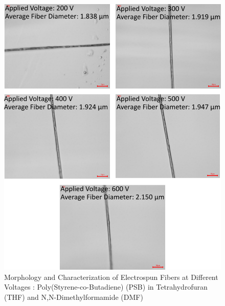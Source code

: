\begin{figure}[!th]
\centering
\includegraphics[scale=0.55]{./Figures/microscopy_psb_thf_dmf.png}
\decoRule
\caption[Morphology and Characterization of Electrospun Fibers at Different Voltages : Poly(Styrene-co-Butadiene) (PSB) in Tetrahydrofuran (THF) and N,N-Dimethylformamide (DMF) ]{Morphology and Characterization of Electrospun Fibers at Different Voltages : Poly(Styrene-co-Butadiene) (PSB) in Tetrahydrofuran (THF) and N,N-Dimethylformamide (DMF) }
\label{fig:microscopy_psb_thf_dmf}
\end{figure}

